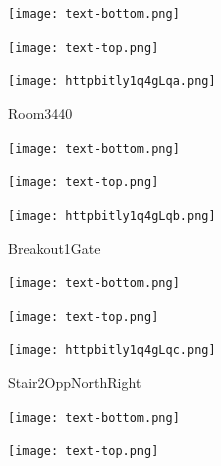 \documentclass[letterpaper]{article}
\begin{document}
 \centerline{\texttt{[image: text-bottom.png]}} 
 
 \pagebreak 
{} 
 \vspace*{\fill} 
 
  \centerline{\texttt{[image: text-top.png]}} 
 
 \vspace{0.5in} 
 
 \begingroup 
 \centerline{\texttt{[image: httpbitly1q4gLqa.png]}} 
 \endgroup 
 \vspace*{\fill} 

 \hfill{\small Room3440} 

  \vspace{0.7in} 
 
 \centerline{\texttt{[image: text-bottom.png]}} 
 
 \pagebreak 
{} 
 \vspace*{\fill} 
 
  \centerline{\texttt{[image: text-top.png]}} 
 
 \vspace{0.5in} 
 
 \begingroup 
 \centerline{\texttt{[image: httpbitly1q4gLqb.png]}} 
 \endgroup 
 \vspace*{\fill} 

 \hfill{\small Breakout1Gate} 

  \vspace{0.7in} 
 
 \centerline{\texttt{[image: text-bottom.png]}} 
 
 \pagebreak 
{} 
 \vspace*{\fill} 
 
  \centerline{\texttt{[image: text-top.png]}} 
 
 \vspace{0.5in} 
 
 \begingroup 
 \centerline{\texttt{[image: httpbitly1q4gLqc.png]}} 
 \endgroup 
 \vspace*{\fill} 

 \hfill{\small Stair2OppNorthRight} 

  \vspace{0.7in} 
 
 \centerline{\texttt{[image: text-bottom.png]}} 
 
 \pagebreak 
{} 
 \vspace*{\fill} 
 
  \centerline{\texttt{[image: text-top.png]}} 
 
 \vspace{0.5in} 
 
\end{document}
